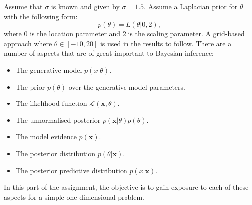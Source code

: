 \documentclass{article}
\begin{document}
Assume that $\sigma$ is known and given by $\sigma = 1.5$. Assume a Laplacian prior for $\theta$ with the following form:
\begin{equation}
 p(\theta) = L(\theta \vert 0, 2),
\end{equation}    
where 0 is the location parameter and 2 is the scaling parameter. A grid-based approach where $\theta \in [-10, 20]$ is used in the results to follow. There are a number of aspects that are of great important to Bayesian inference:
\begin{itemize}
\item The generative model $p(x \vert \theta)$.
\item The prior $p(\theta)$ over the generative model parameters.
\item The likelihood function $\mathcal{L}(\mathbf{x}, \theta)$.
\item The unnormalised posterior $p(\mathbf{x} \vert \theta)p(\theta)$.
\item The model evidence $p(\mathbf{x})$.
\item The posterior distribution $p(\theta \vert \mathbf{x})$.
\item The posterior predictive distribution $p(x \vert \mathbf{x})$.
\end{itemize}

In this part of the assignment, the objective is to gain exposure to each of these aspects for a simple one-dimensional problem. 
\end{document}
